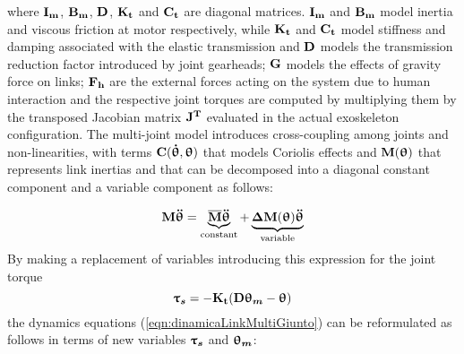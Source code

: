 where $\mathbf{I_m}$, $\mathbf{B_m}$, $\mathbf{D}$, $\mathbf{K_t}$ and $\mathbf{C_t}$ are diagonal matrices.  $\mathbf{I_m}$ and $\mathbf{B_m}$ model inertia and viscous friction at motor respectively, while $\mathbf{K_t}$ and $\mathbf{C_t}$ model stiffness and damping associated with the elastic transmission and $\mathbf{D}$ models  the transmission reduction factor introduced by joint gearheads; $\mathbf{G}$ models the effects of gravity force on links;
$\mathbf{F_h}$ are the external  forces  acting on the system  due to human interaction  and the respective joint torques are computed by multiplying them by the transposed Jacobian matrix  $\mathbf{J^T}$ evaluated in the actual exoskeleton configuration. The multi-joint model introduces cross-coupling among joints and non-linearities, with terms $ \mathbf{C}( { \boldsymbol {\dot{\uptheta}}}, { \boldsymbol {\uptheta}})  $ that models Coriolis effects and $\mathbf{M}({ \boldsymbol {\uptheta}}) $ that represents link inertias and that can be decomposed
into a diagonal constant component and a variable component as follows:

\begin{equation}
\vectm{M }  \vects{\ddot{\uptheta}}=
\underbrace{\overline{\vectm{M} } \vects{\ddot{\uptheta}}}_{\text{constant}}
 + 
\underbrace{\vects{\Delta} \vectm{M} (\vects{\uptheta}) \vects{\ddot{\uptheta}} }_{\text{variable}}
\label{eq:InertialComponent}
\end{equation}
By making a replacement of variables introducing this expression for the  joint torque 
\begin{equation} 
\vects{\uptau_s}=-\vectm{K_t}  ( \vectm{D} \vects{\uptheta_m}- \vects{\uptheta} ) \label{eq:taus} 
\end{equation}
the dynamics equations (\ref{eqn:dinamicaLinkMultiGiunto}) can be reformulated as follows in terms of new variables ${ \boldsymbol {\uptau_s}}$ and ${ \boldsymbol {\uptheta_m}}$:


